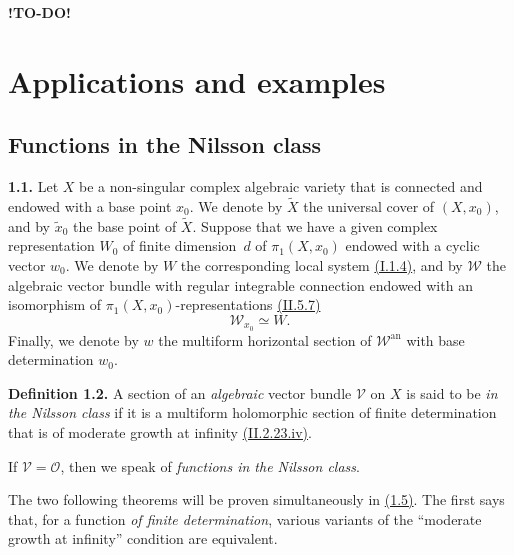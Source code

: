 \documentclass{report}
\newenvironment{rmenv}[1]
  {\phantomsection\par\medskip\noindent\textbf{#1.}\rmfamily}
  {\par\medskip}
\newcommand{\scr}[1]{{\mathscr{#1}}}
\renewcommand{\cal}[1]{{\mathcal{#1}}}
\newcommand{\an}{\mathrm{an}}
\newcommand{\todo}{\textbf{ !TO-DO! }}
\newcommand{\oldpage}[1]{\marginpar{\footnotesize$\Big\vert$ \textit{p.~#1}}}
\begin{document}
\todo













\chapter{Applications and examples}
\label{III}


\section{Functions in the Nilsson class}
\label{III.1}

\begin{rmenv}{1.1}
\label{III.1.1}
\oldpage{122}
  Let $X$ be a non-singular complex algebraic variety that is connected and endowed with a base point $x_0$.
  We denote by $\widetilde{X}$ the universal cover of $(X,x_0)$, and by $\widetilde{x}_0$ the base point of $\widetilde{X}$.
  Suppose that we have a given complex representation $W_0$ of finite dimension~$d$ of $\pi_1(X,x_0)$ endowed with a cyclic vector $w_0$.
  We denote by $W$ the corresponding local system \hyperref[I.1.4]{(I.1.4)}, and by $\scr{W}$ the algebraic vector bundle with regular integrable connection endowed with an isomorphism of $\pi_1(X,x_0)$-representations \hyperref[II.5.7]{(II.5.7)}
  \[
    \scr{W}_{x_0} \simeq W.
  \]
  Finally, we denote by $w$ the multiform horizontal section of $\scr{W}^\an$ with base determination $w_0$.
\end{rmenv}

\begin{rmenv}{Definition 1.2}
\label{III.1.2}
  A section of an \emph{algebraic} vector bundle $\cal{V}$ on $X$ is said to be \emph{in the Nilsson class} if it is a multiform holomorphic section of finite determination that is of moderate growth at infinity \hyperref[II.2.23]{(II.2.23.iv)}.

  If $\cal{V}=\cal{O}$, then we speak of \emph{functions in the Nilsson class}.
\end{rmenv}

The two following theorems will be proven simultaneously in \hyperref[III.1.5proof]{(1.5)}.
The first says that, for a function \emph{of finite determination}, various variants of the ``moderate growth at infinity'' condition are equivalent.
\end{document}
